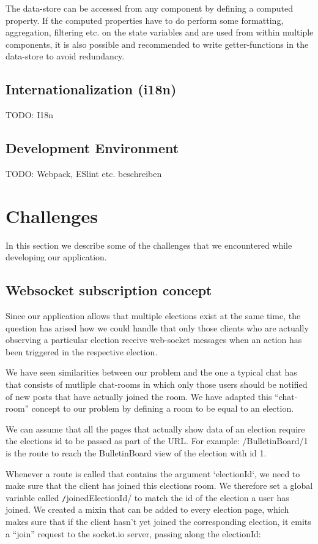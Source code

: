 The data-store can be accessed from any component by defining a computed property. If the computed properties have to do perform some formatting, aggregation, filtering etc. on the state variables and are used from within multiple components, it is also possible and recommended to write getter-functions in the data-store to avoid redundancy.
 
\subsection{Internationalization (i18n)}
TODO: I18n

\subsection{Development Environment}
TODO: Webpack, ESlint etc. beschreiben

\section{Challenges}
In this section we describe some of the challenges that we encountered while developing our application. 
\subsection{Websocket subscription concept}
Since our application allows that multiple elections exist at the same time, the question has arised how we could handle that only those clients who are actually observing a particular election receive web-socket messages when an action has been triggered in the respective election.

We have seen similarities between our problem and the one a typical chat has that consists of mutliple chat-rooms in which only those users should be notified of new posts that have actually joined the room. We have adapted this "`chat-room"' concept to our problem by defining a room to be equal to an election.

We can assume that all the pages that actually show data of an election require the elections id to be passed as part of the URL. For example: /BulletinBoard/1 is the route to reach the BulletinBoard view of the election with id 1.

Whenever a route is called that contains the argument `electionId`, we need to make sure that the client has joined this elections room. We therefore set a global variable called \texttt/joinedElectionId/ to match the id of the election a user has joined. We created a mixin that can be added to every election page, which makes sure that if the client hasn't yet joined the corresponding election, it emits a "`join"' request to the socket.io server, passing along the electionId:

